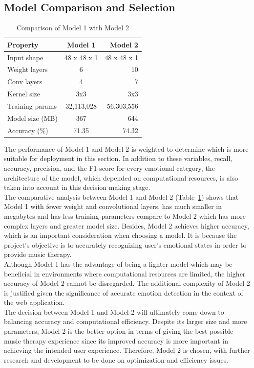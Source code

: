 \subsection{Model Comparison and Selection}
\begin{table}[H]
    \centering
    \renewcommand{\arraystretch}{1.5}
    \begin{tabular*}{\textwidth}{@{\extracolsep{\fill}}lcr}
    \toprule
    \textbf{Property} & \textbf{Model 1} & \textbf{Model 2} \\
    \midrule
    Input shape & 48 x 48 x 1 & 48 x 48 x 1 \\
    Weight layers & 6 & 10 \\
    Conv layers & 4 & 7 \\
    Kernel size & 3x3 & 3x3 \\
    Training params & 32,113,028 & 56,303,556 \\
    Model size (MB) & 367 & 644 \\
    Accuracy (\%) & 71.35 & 74.32 \\
    \bottomrule
    \end{tabular*}
    \caption{Comparison of Model 1 with Model 2}
    \label{tab:comparison-models}
\end{table}
The performance of Model 1 and Model 2 is weighted to determine which is more suitable for deployment in this section.
In addition to these variables, recall, accuracy, precision, and the F1-score for every emotional category, the architecture of the model, which depended on computational resources, is also taken into account in this decision making stage. 
\\
\indent The comparative analysis between Model 1 and Model 2 (Table~\ref{tab:comparison-models}) shows that Model 1 with fewer weight and convolutional layers, has much smaller in megabytes and has less training parameters compare to Model 2 which has more complex layers and greater model size.
Besides, Model 2 achieves higher accuracy, which is an important consideration when choosing a model.
It is because the project's objective is to accurately recognizing user's emotional states in order to provide music therapy. 
\\
\indent Although Model 1 has the advantage of being a lighter model which may be beneficial in environments where computational resources are limited, the higher accuracy of Model 2 cannot be disregarded.
The additional complexity of Model 2 is justified given the significance of accurate emotion detection in the context of the web application.
\\
\indent The decision between Model 1 and Model 2 will ultimately come down to balancing accuracy and computational efficiency.
Despite its larger size and more parameters, Model 2 is the better option in terms of giving the best possible music therapy experience since its improved accuracy is more important in achieving the intended user experience.
Therefore, Model 2 is chosen, with further research and development to be done on optimization and efficiency issues.
\\
